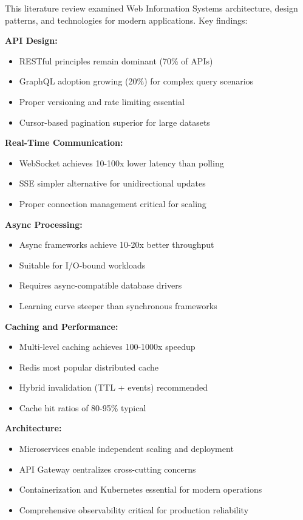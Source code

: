 \documentclass[conference]{IEEEtran}
\begin{document}
\begin{enumerate}
This literature review examined Web Information Systems architecture, design patterns, and technologies for modern applications. Key findings:

\textbf{API Design:}
\begin{itemize}
    \item RESTful principles remain dominant (70\% of APIs)
    \item GraphQL adoption growing (20\%) for complex query scenarios
    \item Proper versioning and rate limiting essential
    \item Cursor-based pagination superior for large datasets
\end{itemize}

\textbf{Real-Time Communication:}
\begin{itemize}
    \item WebSocket achieves 10-100x lower latency than polling
    \item SSE simpler alternative for unidirectional updates
    \item Proper connection management critical for scaling
\end{itemize}

\textbf{Async Processing:}
\begin{itemize}
    \item Async frameworks achieve 10-20x better throughput
    \item Suitable for I/O-bound workloads
    \item Requires async-compatible database drivers
    \item Learning curve steeper than synchronous frameworks
\end{itemize}

\textbf{Caching and Performance:}
\begin{itemize}
    \item Multi-level caching achieves 100-1000x speedup
    \item Redis most popular distributed cache
    \item Hybrid invalidation (TTL + events) recommended
    \item Cache hit ratios of 80-95\% typical
\end{itemize}

\textbf{Architecture:}
\begin{itemize}
    \item Microservices enable independent scaling and deployment
    \item API Gateway centralizes cross-cutting concerns
    \item Containerization and Kubernetes essential for modern operations
    \item Comprehensive observability critical for production reliability
\end{itemize}


\end{enumerate}
\end{document}
